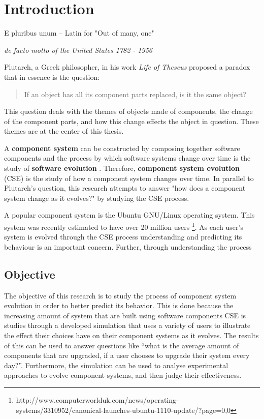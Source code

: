 \chapter{Introduction}
\label{introduction}
\epigraph{E pluribus unum -- Latin for "Out of many, one"}
{\textit{de facto motto of the United States 1782 - 1956}}
Plutarch, a Greek philosopher, in his work \textit{Life of Theseus} 
proposed a paradox that in essence is the question:
\begin{quote}
If an object has all its component parts replaced, is it the same object?
\end{quote}
This question deals with the themes of objects made of components, the change of the component parts,
and how this change effects the object in question.
These themes are at the center of this thesis.

A \textbf{component system} can be constructed by composing together software components \citep{Szyperski2002}
and the process by which software systems change over time is the study of \textbf{software evolution} \citep{lehman1980}.
Therefore, \textbf{component system evolution} (CSE) is the study of how a component system changes over time.
In parallel to Plutarch's question, this research attempts to answer "how does a component system change as it evolves?" by studying the CSE process.

A popular component system is the Ubuntu GNU/Linux operating system.
This system was recently estimated to have over 20 million users \footnote{http://www.computerworlduk.com/news/operating-systems/3310952/canonical-launches-ubuntu-1110-update/?page=0,0}.
As each user's system is evolved through the CSE process understanding and predicting its behaviour is an important concern.
Further, through understanding the process
 
\section{Objective}
The objective of this research is to study the process of component system evolution in order to better predict its behavior.
This is done because the increasing amount of system that are built using software components 
CSE is studies through a developed simulation that uses a variety of users to illustrate the effect their choices have on their component systems as it evolves.
The results of this can be used to answer questions like ``what is the average amount of components that are upgraded, if a user chooses to upgrade their system every day?''.
Furthermore, the simulation can be used to analyse experimental approaches to evolve component systems, and then judge their effectiveness.

